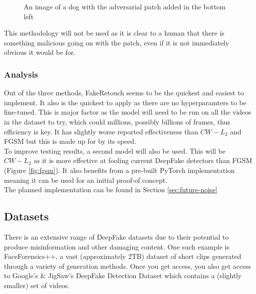 \documentclass{article}
\begin{document}
\begin{figure}[H]
    \centering
    \caption{An image of a dog with the adversarial patch added in the bottom left\cite{brown2017adversarial}}
\end{figure}

This methodology will not be used as it is clear to a human that there is something malicious going on with the patch, even if it is not immediately obvious it would be for.

\subsubsection{Analysis}

Out of the three methods, FakeRetouch seems to be the quickest and easiest to implement. It also is the quickest to apply as there are no hyperparamters to be fine-tuned\cite{huang2020fakeretouch}. This is major factor as the model will need to be run on all the videos in the dataset to try, which could millions, possibly billions of frames, thus efficiency is key. It has slightly worse reported effectiveness than $CW-L_2$ and FGSM but this is made up for by its speed.\\

To improve testing results, a second model will also be used. This will be $CW-L_2$ as it is more effective at fooling current DeepFake detectors than FGSM (Figure \ref{fig:fgsm}). It also benefits from a pre-built PyTorch implementation \cite{cwl2python} meaning it can be used for an initial proof-of concept.\\

The planned implementation can be found in Section \ref{sec:future-noise}

\subsection{Datasets}

There is an extensive range of DeepFake datasets due to their potential to produce misinformation and other damaging content. One such example is FaceForensics++\cite{roessler2019faceforensicspp}, a vast (approximately 2TB) dataset of short clips generated through a variety of generation methods. Once you get access, you also get access to Google's \& JigSaw's DeepFake Detection Dataset\cite{DDD_GoogleJigSaw2019} which contains a (slightly smaller) set of videos.\\
\end{document}
